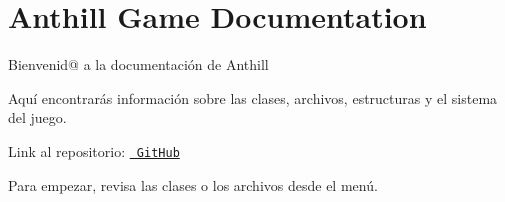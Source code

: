 \chapter{Anthill Game Documentation}
\hypertarget{index}{}\label{index}
Bienvenid@ a la documentación de Anthill 🐜

Aquí encontrarás información sobre las clases, archivos, estructuras y el sistema del juego.


\begin{DoxyItemize}
\item Link al repositorio\+: \href{https://github.com/Aperezn2006/ANTHILL_REP}{\texttt{ Git\+Hub}}
\item Para empezar, revisa las clases o los archivos desde el menú. 
\end{DoxyItemize}